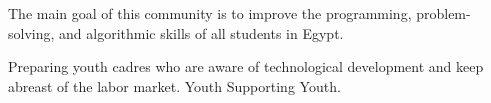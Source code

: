 





The main goal of this community is to improve the programming, problem-solving, and algorithmic skills of all students in Egypt.



\divider

Preparing youth cadres who are aware of technological development and keep abreast of the labor market. Youth Supporting Youth.